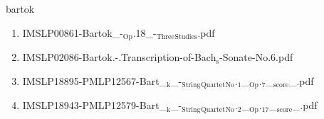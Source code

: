 \documentclass[11pt]{article}
\begin{document}
\item bartok
\label{sec-1-1-1-1-44-8}
\begin{enumerate}
\item IMSLP00861-Bartok\_-$_{\text{Op}}$.18\_-$_{\text{Three}}$$_{\text{Studies}}$.pdf
\label{sec-1-1-1-1-44-8-1}

\item IMSLP02086-Bartok.-.Transcription-of-Bach$_{\text{s}}$-Sonate-No.6.pdf
\label{sec-1-1-1-1-44-8-2}

\item IMSLP18895-PMLP12567-Bart\_$_{\text{k}}$\_-$_{\text{String}}$$_{\text{Quartet}}$$_{\text{No}}$.$_{\text{1}}$\_$_{\text{Op}}$.$_{\text{7}}$\_$_{\text{score}}$\_.pdf
\label{sec-1-1-1-1-44-8-3}

\item IMSLP18943-PMLP12579-Bart\_$_{\text{k}}$\_-$_{\text{String}}$$_{\text{Quartet}}$$_{\text{No}}$.$_{\text{2}}$\_$_{\text{Op}}$.$_{\text{17}}$\_$_{\text{score}}$\_.pdf
\label{sec-1-1-1-1-44-8-4}
\end{enumerate}
\end{document}
